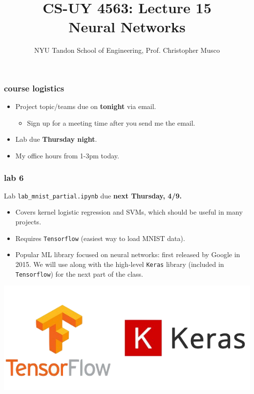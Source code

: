 \documentclass[handout,compress]{beamer}
\title{CS-UY 4563: Lecture 15 \\ Neural Networks}
\author{NYU Tandon School of Engineering, Prof. Christopher Musco}
\date{}
\begin{document}
\begin{frame}
	\titlepage 
\end{frame}


\begin{frame}
	\frametitle{course logistics}
	\begin{itemize}
		\item Project topic/teams due on \textbf{tonight} via email.
		\begin{itemize}
			\item Sign up for a meeting time after you send me the email.
		\end{itemize}
		\item Lab due \textbf{Thursday night}.
		\item My office hours from 1-3pm today.
	\end{itemize}
\end{frame}

\begin{frame}
	\frametitle{lab 6}
	\begin{center}
	Lab \texttt{lab\_mnist\_partial.ipynb} due \textbf{next Thursday, 4/9.}
	\end{center}
	\begin{itemize}
		\item Covers kernel logistic regression and SVMs, which should be useful in many projects. 
		\item Requires \texttt{Tensorflow} (easiest way to load MNIST data). 
		\item Popular ML library focused on neural networks: first released by Google in 2015. We will use along with the high-level \texttt{Keras} library (included in \texttt{Tensorflow}) for the next part of the class.
	\end{itemize}
\vspace{-1em}
	\begin{center}
	\includegraphics[width=.5\textwidth]{kerastf.png}
\end{center}
\end{frame}
\end{document}
